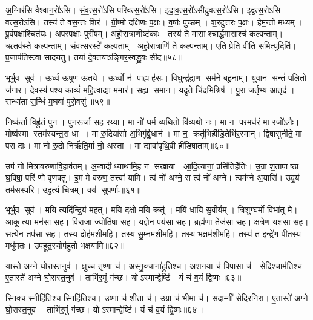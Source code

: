 अ॒ग्निर॑सि वैश्वान॒रो॑ऽसि। सं॒व॒त्स॒रो॑ऽसि परिवत्स॒रो॑ऽसि। इ॒दा॒व॒त्स॒रो॑ऽसीदुवत्स॒रो॑ऽसि। इ॒द्व॒त्स॒रो॑ऽसि वत्स॒रो॑ऽसि। तस्य॑ ते वस॒न्तः  शिर॑। ग्री॒ष्मो दक्षि॑णः प॒क्षः। व॒र्\mbox{}षाः पुच्छम्। श॒रदुत्त॑रः प॒क्षः। हे॒म॒न्तो मध्यम्। पू॒र्व॒प॒क्षाश्चित॑यः। अ॒प॒र॒प॒क्षाः पुरी॑षम्। अ॒हो॒रा॒त्राणीष्ट॑काः। तस्य॑ ते॒ मासाश्चार्द्धमा॒साश्च॑ कल्पन्ताम्। ऋ॒तव॑स्ते कल्पन्ताम्। सं॒व॒त्स॒रस्ते॑ कल्पताम्। अ॒हो॒रा॒त्राणि॑ ते कल्पन्ताम्। एति॒ प्रेति॒ वीति॒ समित्युदिति॑। प्र॒जाप॑तिस्त्वा सादयतु। तया॑ दे॒वत॑याऽङ्गिर॒स्वद्ध्रु॒वः सी॑द॥५८॥
\anuvakamend[चित॑यो॒ नव॑ च]


भूर्भुव॒ सुव॑। ऊ॒र्ध्व ऊ॒षुण॑ ऊ॒तये। ऊ॒र्ध्वो न॑ पा॒ह्यह॑सः। वि॒धुन्द्र॑द्रा॒ण सम॑ने बहू॒नाम्। युवा॑न॒ सन्तं॑ पलि॒तो ज॑गार। दे॒वस्य॑ पश्य॒ काव्यं॑ महि॒त्वाद्या म॒मार॑। सह्य॒ समा॑न। यदृ॒ते चि॑दभि॒श्रिष॑। पु॒रा ज॒र्तृभ्य॑ आ॒तृद॑। सन्धा॑ता स॒न्धिं म॒घवा॑ पुरो॒वसु॑॥५९॥

निष्क॑र्ता॒ विह्रु॑तं॒ पुन॑। पुन॑रू॒र्जा स॒ह र॒य्या। मा नो॑ घर्म व्यथि॒तो वि॑व्यथो नः। मा न॒ पर॒मध॑रं॒ मा रजो॑ऽनैः। मोष्व॑स्मा स्तम॑स्यन्त॒रा धा। मा रु॒द्रिया॑सो अ॒भिगु॑र्वृ॒धान॑। मा न॒ क्रतु॑भिर्\mbox{}हीडि॒तेभि॑र॒स्मान्। द्विषा॑सुनीते॒ मा परा॑ दाः। मा नो॑ रु॒द्रो निर्\mbox{}ऋ॑ति॒र्मा नो॒ अस्ता। मा द्यावा॑पृथि॒वी ही॑डिषाताम्॥६०॥

उप॑ नो मित्रावरुणावि॒हाव॑तम्। अ॒न्वादीध्याथामि॒ह न॑ सखाया। आ॒दि॒त्यानां॒ प्रसि॑तिर्\mbox{}हे॒तिः। उ॒ग्रा श॒तापाष्ठा घ॒विषा॒ परि॑ णो वृणक्तु। इ॒मं मे॑ वरुण॒ तत्त्वा॑ यामि। त्वं नो॑ अग्ने॒ स त्वं नो॑ अग्ने। त्वम॑ग्ने अ॒यासि॑। उद्व॒यं तम॑स॒स्परि॑। उदु॒त्यं चि॒त्रम्। वय॑ सुप॒र्णाः॥६१॥
\anuvakamend[पु॒रो॒वसु॑र्\mbox{}हीडिषाता सुप॒र्णाः]


भूर्भुव॒ सुव॑। मयि॒ त्यदि॑न्द्रि॒यं म॒हत्। मयि॒ दक्षो॒ मयि॒ क्रतु॑। मयि॑ धायि सु॒वीर्यम्। त्रिशु॑ग्घ॒र्मो विभा॑तु मे। आकूत्या॒ मन॑सा स॒ह। वि॒राजा॒ ज्योति॑षा स॒ह। य॒ज्ञेन॒ पय॑सा स॒ह। ब्रह्म॑णा॒ तेज॑सा स॒ह। क्ष॒त्रेण॒ यश॑सा स॒ह। स॒त्येन॒ तप॑सा स॒ह। तस्य॒ दोह॑मशीमहि। तस्य॑ सु॒म्नम॑शीमहि। तस्य॑ भ॒क्षम॑शीमहि। तस्य॑ त॒ इन्द्रे॑ण पी॒तस्य॒ मधु॑मतः। उप॑हूत॒स्योप॑हूतो भक्षयामि॥६२॥
\anuvakamend[यश॑सा स॒ह षट्च॑]

यास्ते॑ अग्ने घो॒रास्त॒नुव॑। क्षुच्च॒ तृष्णा च॑। अस्नु॒क्चाना॑हुतिश्च। अ॒श॒न॒या च॑ पिपा॒सा च॑। से॒दिश्चाम॑तिश्च। ए॒तास्ते॑ अग्ने घो॒रास्त॒नुव॑। ताभि॑र॒मुं ग॑च्छ। योऽस्मान्द्वेष्टि॑। यं च॑ व॒यं द्वि॒ष्मः॥६३॥
\anuvakamend

स्निक्च॒ स्नीहि॑तिश्च॒ स्निहि॑तिश्च। उ॒ष्णा च॑ शी॒ता च॑। उ॒ग्रा च॑ भी॒मा च॑। स॒दाम्नी॑ से॒दिरनि॑रा। ए॒तास्ते॑ अग्ने घो॒रास्त॒नुव॑। ताभि॑र॒मुं ग॑च्छ। योऽस्मान्द्वेष्टि॑। यं च॑ व॒यं द्वि॒ष्मः॥६४॥
\anuvakamend

